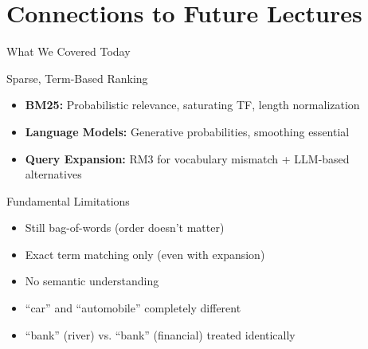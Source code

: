 \documentclass[aspectratio=169]{beamer}
\newif\ifanimated
\newcommand{\cpause}{\ifanimated\pause\fi}
\begin{document}
\section{Connections to Future Lectures}

\begin{frame}[plain]
\sectionpage
\end{frame}

\begin{frame}{What We Covered Today}
\begin{block}{Sparse, Term-Based Ranking}
\begin{itemize}
    \item \textbf{BM25:} Probabilistic relevance, saturating TF, length normalization
    \item \textbf{Language Models:} Generative probabilities, smoothing essential
    \item \textbf{Query Expansion:} RM3 for vocabulary mismatch + LLM-based alternatives
\end{itemize}\cpause
\end{block}

\vspace{1em}

\begin{alertblock}{Fundamental Limitations}
\begin{itemize}
    \item Still bag-of-words (order doesn't matter)
    \item Exact term matching only (even with expansion)
    \item No semantic understanding
    \item ``car'' and ``automobile'' completely different
    \item ``bank'' (river) vs. ``bank'' (financial) treated identically
\end{itemize}\cpause
\end{alertblock}
\end{frame}

\appendix
\end{document}
